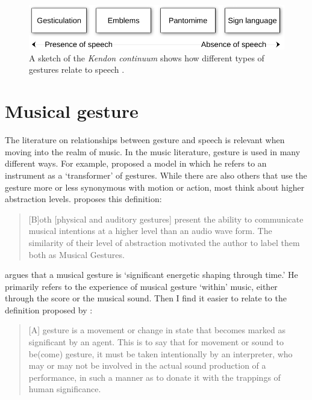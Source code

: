 \begin{figure}[tp]
\includegraphics[width=\columnwidth]{figures/23-kendon-crop.pdf}
\caption{A sketch of the \emph{Kendon continuum} shows how different types of gestures relate to speech \citep[7]{mcneill_gesture_2005}.}
\label{fig:continuum}
\end{figure}


\section{Musical gesture}

The literature on relationships between gesture and speech is relevant when moving into the realm of music. In the music literature, gesture is used in many different ways. For example, \citet{bielawski_instrumentalmusik_1979} proposed a model in which he refers to an instrument as a `transformer' of gestures. While there are also others that use the gesture more or less synonymous with motion or action, most think about higher abstraction levels. \citet[p.16]{metois_musical_1997} proposes this definition:

\begin{quote}
[B]oth [physical and auditory gestures] present the ability to communicate musical intentions at a higher level than an audio wave form. The similarity of their level of abstraction motivated the author to label them both as Musical Gestures.
\end{quote}

\citet[p.95]{hatten_interpreting_2004} argues that a musical gesture is `significant energetic shaping through time.' He primarily refers to the experience of musical gesture `within' music, either through the score or the musical sound. Then I find it easier to relate to the definition proposed by \citet[p.xx]{gritten_music_2006}:

\begin{quote}
[A] gesture is a movement or change in state that becomes marked as significant by an agent. This is to say that for movement or sound to be(come) gesture, it must be taken intentionally by an interpreter, who may or may not be involved in the actual sound production of a performance, in such a manner as to donate it with the trappings of human significance.
\end{quote}

